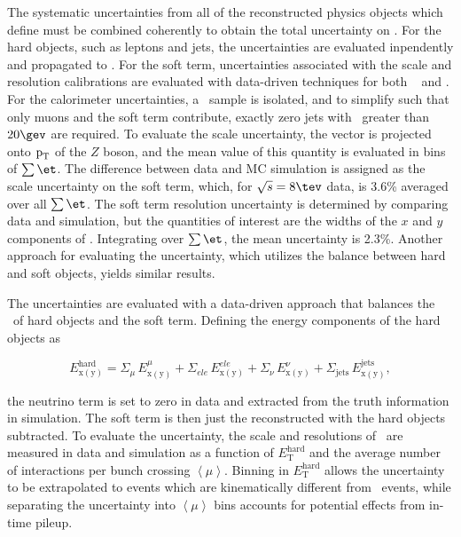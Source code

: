 The systematic uncertainties from all of the reconstructed physics objects which
define \etmiss must be combined coherently to obtain the total
uncertainty on \etmiss. For the hard objects, such as leptons and
jets, the uncertainties are evaluated inpendently and propagated to
\etmiss. For the soft term, uncertainties associated with the scale
and resolution calibrations are evaluated with data-driven
techniques for both \calomet~\cite{bib:ATLAS-CONF-2013-082} and
\trkmet. For the calorimeter \etmiss uncertainties, a \Zmm~sample is
isolated, and to simplify \etmiss such that only muons and the soft
term contribute, exactly zero jets with \pt~greater than $20 \gev$ are
required. To evaluate
the scale uncertainty, the \etmiss vector is projected onto
$\boldsymbol{$p$}_{\mathrm{T}}$ of the $Z$ boson, and the mean value of this quantity is
evaluated in bins of $\sum{\et}$. The difference between data and MC
simulation is assigned as the scale uncertainty on the soft term,
which, for $\sqrts = 8 \tev$ data, is 3.6\% averaged over all
$\sum{\et}$. The soft term resolution uncertainty is determined by
comparing data and simulation, but the quantities of interest are the
widths of the $x$ and $y$ components of \etmiss. Integrating over
$\sum{\et}$, the mean uncertainty is 2.3\%. Another approach for
evaluating the uncertainty, which utilizes the balance between hard
and soft objects, yields similar results. 

The \trkmet uncertainties are evaluated with a data-driven approach that balances
the \pt~of hard objects and the soft term. Defining the energy
components of the hard objects as

\begin{equation}
E_{\mathrm {x(y)}}^{\mathrm {hard}} = \Sigma_{\mu}\, E_{\mathrm
  {x(y)}}^{\mu} + \Sigma_{ele}\, E_{\mathrm{x(y)}}^{ele} +
\Sigma_{\nu} \,  E_{\mathrm {x(y)}}^{\nu} + \Sigma_{\textrm{jets}}\,
E_{\mathrm {x(y)}}^{\textrm{jets}},
\end{equation}

\noindent
the neutrino term is set to zero in data and extracted from the truth
information in simulation. The soft term is then just the reconstructed
\trkmet with the hard objects subtracted. To evaluate the uncertainty,
the scale and resolutions of \ptsoft~are measured in data and
simulation as a function of $E_{\mathrm {T}}^{\mathrm {hard}}$ and the
average number of interactions per bunch crossing $\left \langle \mu
\right \rangle$. Binning in $E_{\mathrm {T}}^{\mathrm {hard}}$ allows
the uncertainty to be extrapolated to events which are kinematically
different from \Zmm~events, while separating the uncertainty into
$\left \langle \mu \right \rangle$ bins accounts for potential effects
from in-time pileup. 

